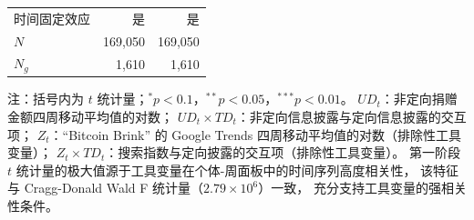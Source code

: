 \begin{table}[htbp]
\begin{tabularx}{\textwidth}{Xrr}
        时间固定效应 & 是 & 是 \\
        $N$         & 169,050 & 169,050 \\
        $N_g$       & 1,610   & 1,610 \\
        \bottomrule
    \end{tabularx}
    \begin{minipage}{\textwidth}
        \vspace{0.3em}
        \footnotesize 注：括号内为 $t$ 统计量；$^{*}p<0.1$，$^{**}p<0.05$，$^{***}p<0.01$。
        $UD_t$：非定向捐赠金额四周移动平均值的对数；
        $UD_t \times TD_t$：非定向信息披露与定向信息披露的交互项；
        $Z_t$：“Bitcoin Brink” 的 Google Trends 四周移动平均值的对数（排除性工具变量）；
        $Z_t \times TD_t$：搜索指数与定向披露的交互项（排除性工具变量）。
        第一阶段 $t$ 统计量的极大值源于工具变量在个体-周面板中的时间序列高度相关性，
        该特征与 Cragg-Donald Wald F 统计量（$2.79 \times 10^6$）一致，
        充分支持工具变量的强相关性条件。
    \end{minipage}
\end{table}
